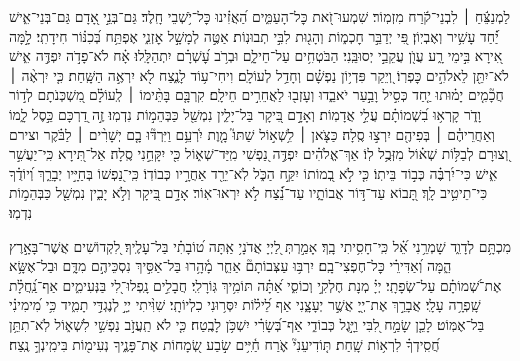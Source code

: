\documentclass[twoside, openany, parskip=half, 11pt]{book}
\begin{document}
\begin{sometimes}

לַמְנַצֵּ֬חַ ׀ לִבְנֵי־קֹ֬רַח מִזְמֽוֹר׃
שִׁמְעוּ־זֹ֭את כׇּל־הָעַמִּ֑ים הַ֝אֲזִ֗ינוּ כׇּל־יֹ֥שְׁבֵי חָֽלֶד׃
גַּם־בְּנֵ֣י אָ֭דָם גַּם־בְּנֵי־אִ֑ישׁ יַ֗֝חַד עָשִׁ֥יר וְאֶבְיֽוֹן׃
פִּ֭י יְדַבֵּ֣ר חׇכְמ֑וֹת וְהָג֖וּת לִבִּ֣י תְבוּנֽוֹת׃
אַטֶּ֣ה לְמָשָׁ֣ל אׇזְנִ֑י אֶפְתַּ֥ח בְּ֝כִנּ֗וֹר חִידָתִֽי׃
לָ֣מָּה אִ֭ירָא בִּ֣ימֵי רָ֑ע עֲוֺ֖ן עֲקֵבַ֣י יְסוּבֵּֽנִי׃
הַבֹּטְחִ֥ים עַל־חֵילָ֑ם וּבְרֹ֥ב עׇ֝שְׁרָ֗ם יִתְהַלָּֽלוּ׃
אָ֗ח לֹא־פָדֹ֣ה יִפְדֶּ֣ה אִ֑ישׁ לֹא־יִתֵּ֖ן לֵאלֹהִ֣ים כׇּפְרֽוֹ׃
וְ֭יֵקַר פִּדְי֥וֹן נַפְשָׁ֗ם וְחָדַ֥ל לְעוֹלָֽם׃
וִיחִי־ע֥וֹד לָנֶ֑צַח לֹ֖א יִרְאֶ֣ה הַשָּֽׁחַת׃
כִּ֤י יִרְאֶ֨ה ׀ חֲכָ֘מִ֤ים יָמ֗וּתוּ יַ֤חַד כְּסִ֣יל וָבַ֣עַר יֹאבֵ֑דוּ וְעָזְב֖וּ לַאֲחֵרִ֣ים חֵילָֽם׃
קִרְבָּ֤ם בָּתֵּ֨ימוֹ ׀ לְֽעוֹלָ֗ם מִ֭שְׁכְּנֹתָם לְד֣וֹר וָדֹ֑ר קָרְא֥וּ בִ֝שְׁמוֹתָ֗ם עֲלֵ֣י אֲדָמֽוֹת׃
וְאָדָ֣ם בִּ֭יקָר בַּל־יָלִ֑ין נִמְשַׁ֖ל כַּבְּהֵמ֣וֹת נִדְמֽוּ׃
זֶ֣ה דַ֭רְכָּם כֵּ֣סֶל לָ֑מוֹ וְאַחֲרֵיהֶ֓ם ׀ בְּפִיהֶ֖ם יִרְצ֣וּ סֶֽלָה׃
כַּצֹּ֤אן ׀ לִ֥שְׁא֣וֹל שַׁתּוּ֮ מָ֤וֶת יִ֫רְעֵ֥ם וַיִּרְדּ֘וּ בָ֤ם יְשָׁרִ֨ים ׀ לַבֹּ֗קֶר וצירם וְ֭צוּרָם לְבַלּ֥וֹת שְׁא֗וֹל מִזְּבֻ֥ל לֽוֹ׃
אַךְ־אֱלֹהִ֗ים יִפְדֶּ֣ה נַ֭פְשִׁי מִֽיַּד־שְׁא֑וֹל כִּ֖י יִקָּחֵ֣נִי סֶֽלָה׃
אַל־תִּ֭ירָא כִּֽי־יַעֲשִׁ֣ר אִ֑ישׁ כִּי־יִ֝רְבֶּ֗ה כְּב֣וֹד בֵּיתֽוֹ׃
כִּ֤י לֹ֣א בְ֭מוֹתוֹ יִקַּ֣ח הַכֹּ֑ל לֹֽא־יֵרֵ֖ד אַחֲרָ֣יו כְּבוֹדֽוֹ׃
כִּֽי־נַ֭פְשׁוֹ בְּחַיָּ֣יו יְבָרֵ֑ךְ וְ֝יוֹדֻ֗ךָ כִּי־תֵיטִ֥יב לָֽךְ׃
תָּ֭בוֹא עַד־דּ֣וֹר אֲבוֹתָ֑יו עַד־נֵ֗֝צַח לֹ֣א יִרְאוּ־אֽוֹר׃
אָדָ֣ם בִּ֭יקָר וְלֹ֣א יָבִ֑ין נִמְשַׁ֖ל כַּבְּהֵמ֣וֹת נִדְמֽוּ׃

\sepline

%
מִכְתָּ֥ם לְדָוִ֑ד שָׁמְרֵ֥נִי אֵ֝֗ל כִּֽי־חָסִ֥יתִי בָֽךְ׃ אָמַ֣רְתְּ לַ֭יְיָ אֲדֹנָי֥ אַֽתָּה ט֝וֹבָתִ֗י בַּל־עָלֶֽיךָ׃ לִ֭קְדוֹשִׁים אֲשֶׁר־בָּאָ֣רֶץ הֵ֑מָּה וְ֝אַדִּירֵ֗י כׇּל־חֶפְצִי־בָֽם׃ יִרְבּ֥וּ עַצְּבוֹתָם֘ אַחֵ֢ר מָ֫הָ֥רוּ בַּל־אַסִּ֣יךְ נִסְכֵּיהֶ֣ם מִדָּ֑ם וּבַל־אֶשָּׂ֥א אֶת־שְׁ֝מוֹתָ֗ם עַל־שְׂפָתָֽי׃ יְיָ֗ מְנָת חֶלְקִ֣י וְכוֹסִ֑י אַ֝תָּ֗ה תּוֹמִ֥יךְ גּֽוֹרָלִֽי׃ חֲבָלִ֣ים נָֽפְלוּ־לִ֭י בַּנְּעִימִ֑ים אַף־נַֽ֝חֲלָ֗ת שָֽׁפְרָ֥ה עָלָֽי׃ אֲבָרֵ֣ךְ אֶת־יְ֖יָ אֲשֶׁ֣ר יְעָצָ֑נִי אַף לֵ֝יל֗וֹת יִסְּר֥וּנִי כִלְיוֹתָֽי׃ שִׁוִּ֨יתִי יְיָ֣ לְנֶגְדִּ֣י תָמִ֑יד כִּ֥י מִ֝ימִינִ֗י בַּל־אֶמּֽוֹט׃ לָכֵ֤ן שָׂמַ֣ח לִ֭בִּי וַיָּ֣גֶל כְּבוֹדִ֑י אַף־בְּ֝שָׂרִ֗י יִשְׁכֹּ֥ן לָבֶֽטַח׃ כִּ֤י לֹא תַֽעֲזֹ֣ב נַפְשִׁ֣י לִשְׁא֑וֹל לֹֽא־תִתֵּ֥ן חֲ֝סִֽידְךָ֗ לִרְא֥וֹת שָֽׁחַת׃ תּ֤וֹדִיעֵנִי֘ אֹ֢רַח חַ֫יִּ֥ים שׂ֣בַע שְׂ֭מָחוֹת אֶת־פָּנֶ֑יךָ נְעִימ֖וֹת בִּימִֽינְךָ֣ נֶֽצַח׃
\end{sometimes}
\end{document}
